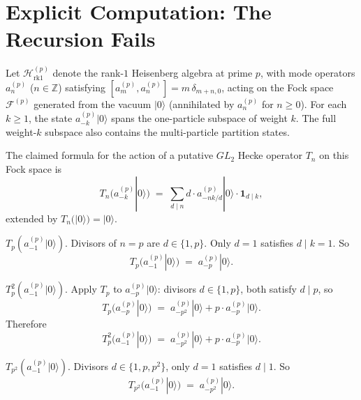\section{Explicit Computation: The Recursion Fails}
\label{v4-arith:kb:recursion-fails}

Let \(\mathcal{H}^{(p)}_{\mathrm{rk1}}\) denote the rank-\(1\) Heisenberg
algebra at prime \(p\), with mode operators \(a^{(p)}_{n}\) (\(n\in\mathbb{Z}\))
satisfying \([a^{(p)}_{m},a^{(p)}_{n}]=m\,\delta_{m+n,0}\), acting
on the Fock space \(\mathcal{F}^{(p)}\) generated from the vacuum
\(|0\rangle\) (annihilated by \(a^{(p)}_{n}\) for \(n\geq 0\)).
For each \(k\ge1\), the state \(a^{(p)}_{-k}|0\rangle\) spans the
one-particle subspace of weight \(k\). The full weight-\(k\) subspace
also contains the multi-particle partition states.

The claimed formula for the action of a putative \(GL_{2}\) Hecke
operator \(T_{n}\) on this Fock space is
\begin{equation}
T_{n}(a^{(p)}_{-k}|0\rangle)\;=\;\sum_{d\mid n}d\cdot a^{(p)}_{-nk/d}|0\rangle\cdot\mathbf{1}_{d\mid k},
\end{equation}
extended by \(T_{n}(|0\rangle)=|0\rangle\).

\begin{computation}
\label{v4-arith:comp:T_p-on-a_-1}
\(T_{p}(a^{(p)}_{-1}|0\rangle)\). Divisors of \(n=p\) are
\(d\in\{1,p\}\). Only \(d=1\) satisfies \(d\mid k=1\). So
\begin{equation}
T_{p}(a^{(p)}_{-1}|0\rangle)\;=\;a^{(p)}_{-p}|0\rangle.
\end{equation}
\end{computation}

\begin{computation}
\label{v4-arith:comp:T_p-squared}
\(T_{p}^{2}(a^{(p)}_{-1}|0\rangle)\). Apply \(T_{p}\) to
\(a^{(p)}_{-p}|0\rangle\): divisors \(d\in\{1,p\}\), both satisfy
\(d\mid p\), so
\begin{equation}
T_{p}(a^{(p)}_{-p}|0\rangle)\;=\;a^{(p)}_{-p^{2}}|0\rangle
+p\cdot a^{(p)}_{-p}|0\rangle.
\end{equation}
Therefore
\begin{equation}
T_{p}^{2}(a^{(p)}_{-1}|0\rangle)\;=\;a^{(p)}_{-p^{2}}|0\rangle
+p\cdot a^{(p)}_{-p}|0\rangle.
\end{equation}
\end{computation}

\begin{computation}
\label{v4-arith:comp:T_p-squared-direct}
\(T_{p^{2}}(a^{(p)}_{-1}|0\rangle)\). Divisors \(d\in\{1,p,p^{2}\}\),
only \(d=1\) satisfies \(d\mid 1\). So
\begin{equation}
T_{p^{2}}(a^{(p)}_{-1}|0\rangle)\;=\;a^{(p)}_{-p^{2}}|0\rangle.
\end{equation}
\end{computation}

